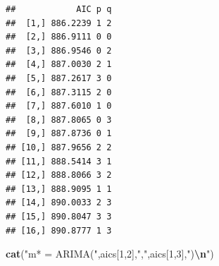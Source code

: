 \documentclass[
]{article}
\newenvironment{Shaded}{\begin{snugshade}}{\end{snugshade}}
\newcommand{\AttributeTok}[1]{\textcolor[rgb]{0.13,0.29,0.53}{#1}}
\newcommand{\ConstantTok}[1]{\textcolor[rgb]{0.56,0.35,0.01}{#1}}
\newcommand{\ControlFlowTok}[1]{\textcolor[rgb]{0.13,0.29,0.53}{\textbf{#1}}}
\newcommand{\DecValTok}[1]{\textcolor[rgb]{0.00,0.00,0.81}{#1}}
\newcommand{\FunctionTok}[1]{\textcolor[rgb]{0.13,0.29,0.53}{\textbf{#1}}}
\newcommand{\NormalTok}[1]{#1}
\newcommand{\OtherTok}[1]{\textcolor[rgb]{0.56,0.35,0.01}{#1}}
\newcommand{\SpecialCharTok}[1]{\textcolor[rgb]{0.81,0.36,0.00}{\textbf{#1}}}
\newcommand{\StringTok}[1]{\textcolor[rgb]{0.31,0.60,0.02}{#1}}
\begin{document}
\begin{Shaded}
\end{Shaded}

\begin{verbatim}
##            AIC p q
##  [1,] 886.2239 1 2
##  [2,] 886.9111 0 0
##  [3,] 886.9546 0 2
##  [4,] 887.0030 2 1
##  [5,] 887.2617 3 0
##  [6,] 887.3115 2 0
##  [7,] 887.6010 1 0
##  [8,] 887.8065 0 3
##  [9,] 887.8736 0 1
## [10,] 887.9656 2 2
## [11,] 888.5414 3 1
## [12,] 888.8066 3 2
## [13,] 888.9095 1 1
## [14,] 890.0033 2 3
## [15,] 890.8047 3 3
## [16,] 890.8777 1 3
\end{verbatim}

\begin{Shaded}
\begin{Highlighting}[]
\FunctionTok{cat}\NormalTok{(}\StringTok{"m* = ARIMA("}\NormalTok{,aics[}\DecValTok{1}\NormalTok{,}\DecValTok{2}\NormalTok{],}\StringTok{","}\NormalTok{,aics[}\DecValTok{1}\NormalTok{,}\DecValTok{3}\NormalTok{],}\StringTok{")}\SpecialCharTok{\textbackslash{}n}\StringTok{"}\NormalTok{)}
\end{Highlighting}
\end{Shaded}
\end{document}
